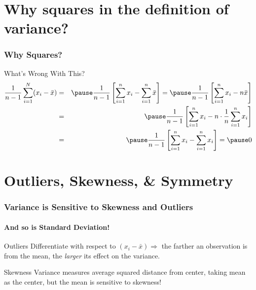 \section{Why squares in the definition of variance?}
\begin{frame}
\frametitle{Why Squares?}
\begin{center}\end{center}
\begin{alertblock}{What's Wrong With This?}
	\begin{eqnarray*}
		\displaystyle\frac{1}{n-1}\sum_{i=1}^N (x_i - \bar{x}) &=& \pause\frac{1}{n-1}\left[\sum_{i=1}^n x_i - \sum_{i=1}^n \bar{x} \right] = \pause\frac{1}{n-1}\left[ \sum_{i=1}^n x_i  - n\bar{x}\right]\\
			&=& \pause \frac{1}{n-1}\left[ \sum_{i=1}^n x_i  - n\cdot\frac{1}{n} \sum_{i=1}^n x_i\right]\\ &=& \pause \frac{1}{n-1}\left[ \sum_{i=1}^n x_i  -  \sum_{i=1}^n x_i\right] =\pause 0
	\end{eqnarray*}
\end{alertblock}

\end{frame}
\section{Outliers, Skewness, \& Symmetry}

\begin{frame}
\frametitle{Variance is Sensitive to Skewness and Outliers}
\framesubtitle{And so is Standard Deviation!}
\begin{center}\end{center}


\begin{block}{Outliers}
Differentiate with respect to $(x_i-\bar{x})\Rightarrow$ the farther an observation is from the mean, the \emph{larger} its effect on the variance.
\end{block}


\begin{block}{Skewness}
Variance measures average squared distance from center, taking \alert{mean} as the center, but the mean is sensitive to skewness!
\end{block}

\end{frame}

